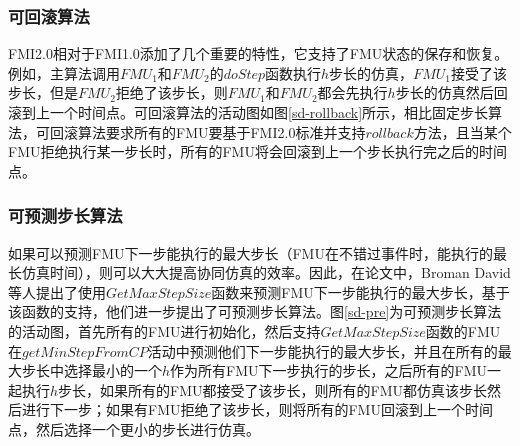 \subsubsection{可回滚算法}
FMI2.0相对于FMI1.0添加了几个重要的特性，它支持了FMU状态的保存和恢复。例如，主算法调用$FMU_{1}$和$FMU_{2}$的$doStep$函数执行$h$步长的仿真，$FMU_{1}$接受了该步长，但是$FMU_{2}$拒绝了该步长，则$FMU_{1}$和$FMU_{2}$都会先执行$h$步长的仿真然后回滚到上一个时间点。可回滚算法的活动图如图\ref{sd-rollback}所示，相比固定步长算法，可回滚算法要求所有的FMU要基于FMI2.0标准并支持$rollback$方法，且当某个FMU拒绝执行某一步长时，所有的FMU将会回滚到上一个步长执行完之后的时间点。
\subsubsection{可预测步长算法}
如果可以预测FMU下一步能执行的最大步长（FMU在不错过事件时，能执行的最长仿真时间），则可以大大提高协同仿真的效率。因此，在论文\cite{Broman2013Determinate}中，Broman David等人提出了使用$GetMaxStepSize$函数来预测FMU下一步能执行的最大步长，基于该函数的支持，他们进一步提出了可预测步长算法。图\ref{sd-pre}为可预测步长算法的活动图，首先所有的FMU进行初始化，然后支持$GetMaxStepSize$函数的FMU在$getMinStepFromCP$活动中预测他们下一步能执行的最大步长，并且在所有的最大步长中选择最小的一个$h$作为所有FMU下一步执行的步长，之后所有的FMU一起执行$h$步长，如果所有的FMU都接受了该步长，则所有的FMU都仿真该步长然后进行下一步；如果有FMU拒绝了该步长，则将所有的FMU回滚到上一个时间点，然后选择一个更小的步长进行仿真。

